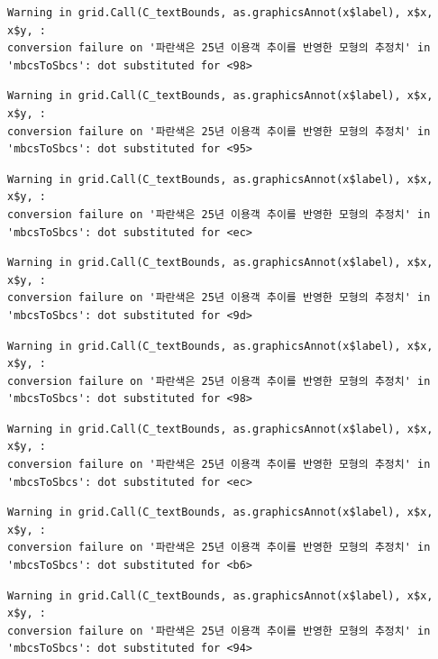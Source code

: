 \documentclass[
  letterpaper,
  DIV=11,
  numbers=noendperiod]{scrreprt}
\begin{document}
\begin{verbatim}
Warning in grid.Call(C_textBounds, as.graphicsAnnot(x$label), x$x, x$y, :
conversion failure on '파란색은 25년 이용객 추이를 반영한 모형의 추정치' in
'mbcsToSbcs': dot substituted for <98>
\end{verbatim}

\begin{verbatim}
Warning in grid.Call(C_textBounds, as.graphicsAnnot(x$label), x$x, x$y, :
conversion failure on '파란색은 25년 이용객 추이를 반영한 모형의 추정치' in
'mbcsToSbcs': dot substituted for <95>
\end{verbatim}

\begin{verbatim}
Warning in grid.Call(C_textBounds, as.graphicsAnnot(x$label), x$x, x$y, :
conversion failure on '파란색은 25년 이용객 추이를 반영한 모형의 추정치' in
'mbcsToSbcs': dot substituted for <ec>
\end{verbatim}

\begin{verbatim}
Warning in grid.Call(C_textBounds, as.graphicsAnnot(x$label), x$x, x$y, :
conversion failure on '파란색은 25년 이용객 추이를 반영한 모형의 추정치' in
'mbcsToSbcs': dot substituted for <9d>
\end{verbatim}

\begin{verbatim}
Warning in grid.Call(C_textBounds, as.graphicsAnnot(x$label), x$x, x$y, :
conversion failure on '파란색은 25년 이용객 추이를 반영한 모형의 추정치' in
'mbcsToSbcs': dot substituted for <98>
\end{verbatim}

\begin{verbatim}
Warning in grid.Call(C_textBounds, as.graphicsAnnot(x$label), x$x, x$y, :
conversion failure on '파란색은 25년 이용객 추이를 반영한 모형의 추정치' in
'mbcsToSbcs': dot substituted for <ec>
\end{verbatim}

\begin{verbatim}
Warning in grid.Call(C_textBounds, as.graphicsAnnot(x$label), x$x, x$y, :
conversion failure on '파란색은 25년 이용객 추이를 반영한 모형의 추정치' in
'mbcsToSbcs': dot substituted for <b6>
\end{verbatim}

\begin{verbatim}
Warning in grid.Call(C_textBounds, as.graphicsAnnot(x$label), x$x, x$y, :
conversion failure on '파란색은 25년 이용객 추이를 반영한 모형의 추정치' in
'mbcsToSbcs': dot substituted for <94>
\end{verbatim}
\end{document}
